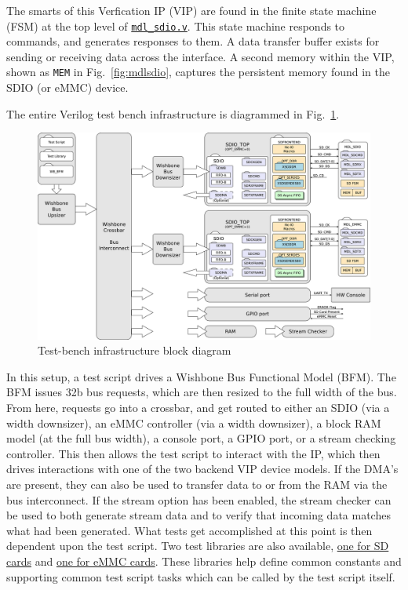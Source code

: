 \documentclass{gqtekspec}
\newcommand{\zhref}[2]{\href{#1}{\textcolor{dkblue}{#2}}}
\begin{document}
The smarts of this Verfication IP (VIP) are found in the finite state machine
(FSM) at the top level of \zhref{../bench/verilog/mdl\_sdio.v}{\tt mdl\_sdio.v}.
This state machine responds to commands, and generates responses to them.  A
data transfer buffer exists for sending or receiving data across the interface.
A second memory within the VIP, shown as {\tt MEM} in Fig.~\ref{fig:mdlsdio},
captures the persistent memory found in the SDIO (or eMMC) device.

The entire Verilog test bench infrastructure is diagrammed in
Fig.~\ref{fig:vlogtb}.
\begin{figure}\begin{center}
\includegraphics[width=5.0in]{gfx/vlogtb.eps}
\caption{Test-bench infrastructure block diagram}\label{fig:vlogtb}
\end{center}\end{figure}
In this setup, a test script drives a Wishbone Bus Functional Model (BFM).
The BFM issues 32b bus requests, which are then resized to the full width
of the bus.  From here, requests go into a crossbar, and get routed to either
an SDIO (via a width downsizer), an eMMC controller (via a width downsizer),
a block RAM model (at the full bus width), a console port, a GPIO port,
or a stream checking controller.  This then allows the test
script to interact with the IP, which then drives interactions with one of the
two backend VIP device models.  If the DMA's are present, they can also be used
to transfer data to or from the RAM via the bus interconnect.  If the stream
option has been enabled, the stream checker can be used to both generate
stream data and to verify that incoming data matches what had been generated.
What tests get accomplished at this point is then dependent upon the test
script.  Two test libraries are also available,
\zhref{../bench/testscript/sdiolib.v}{one for SD cards} and
\zhref{../bench/testscript/emmclib.v}{one for eMMC cards}.  These
libraries help define common constants and supporting common test script tasks
which can be called by the test script itself.
\end{document}
